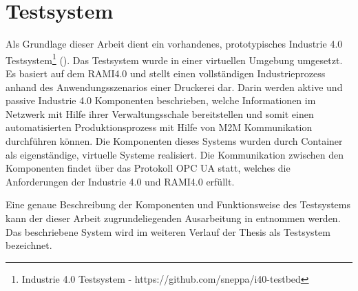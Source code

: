 \section{Testsystem}
\label{Grundlagen:Testsystem}
Als Grundlage dieser Arbeit dient ein vorhandenes, prototypisches Industrie 4.0 Testsystem\footnote{Industrie 4.0 Testsystem - https://github.com/sneppa/i40-testbed} (\cite{Weber2018}). Das Testsystem wurde in einer virtuellen Umgebung umgesetzt. Es basiert auf dem \ac{RAMI4.0} und stellt einen vollständigen Industrieprozess anhand des Anwendungsszenarios einer Druckerei dar. Darin werden aktive und passive Industrie 4.0 Komponenten beschrieben, welche Informationen im Netzwerk mit Hilfe ihrer Verwaltungsschale bereitstellen und somit einen automatisierten Produktionsprozess mit Hilfe von \ac{M2M} Kommunikation durchführen können. Die Komponenten dieses Systems wurden durch Container als eigenständige, virtuelle Systeme realisiert. Die Kommunikation zwischen den Komponenten findet über das Protokoll \ac{OPC UA} statt, welches die Anforderungen der Industrie 4.0 und \ac{RAMI4.0} erfüllt.

Eine genaue Beschreibung der Komponenten und Funktionsweise des Testsystems kann der dieser Arbeit zugrundeliegenden Ausarbeitung in \cite{Weber2018} entnommen werden. Das beschriebene System wird im weiteren Verlauf der Thesis als Testsystem bezeichnet.
